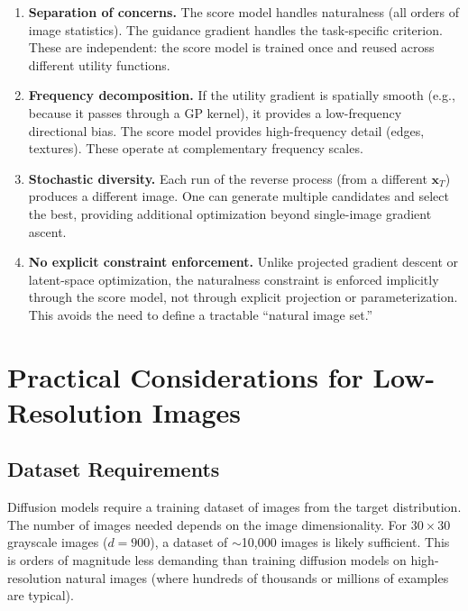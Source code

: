 \documentclass[11pt]{article}
\newcommand{\xb}{\mathbf{x}}
\begin{document}
  \begin{enumerate}
      \item \textbf{Separation of concerns.} The score model handles
            naturalness (all orders of image statistics). The guidance
            gradient handles the task-specific criterion. These are
            independent: the score model is trained once and reused
            across different utility functions.

      \item \textbf{Frequency decomposition.} If the utility gradient is
            spatially smooth (e.g., because it passes through a GP kernel),
            it provides a low-frequency directional bias. The score model
            provides high-frequency detail (edges, textures). These operate
            at complementary frequency scales.

      \item \textbf{Stochastic diversity.} Each run of the reverse process
            (from a different $\xb_T$) produces a different image. One can
            generate multiple candidates and select the best, providing
            additional optimization beyond single-image gradient ascent.

      \item \textbf{No explicit constraint enforcement.} Unlike projected
            gradient descent or latent-space optimization, the naturalness
            constraint is enforced implicitly through the score model, not
            through explicit projection or parameterization. This avoids
            the need to define a tractable ``natural image set.''
  \end{enumerate}

  \section{Practical Considerations for Low-Resolution Images}

  \subsection{Dataset Requirements}

  Diffusion models require a training dataset of images from the target
  distribution. The number of images needed depends on the image
  dimensionality. For $30 \times 30$ grayscale images ($d = 900$),
  a dataset of $\sim$10,000 images is likely sufficient. This is orders
  of magnitude less demanding than training diffusion models on
  high-resolution natural images (where hundreds of thousands or millions
  of examples are typical).
\end{document}
